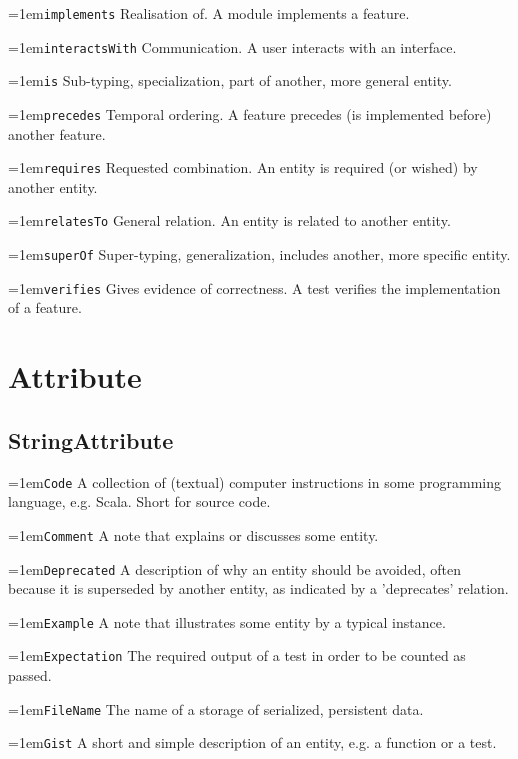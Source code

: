 \documentclass[9pt,a4paper,oneside]{report}
\begin{document}
\begin{multicols*}{4}
\hangindent=1em\lstinline+implements+ Realisation of. A module implements a feature.

\hangindent=1em\lstinline+interactsWith+ Communication. A user interacts with an interface.

\hangindent=1em\lstinline+is+ Sub-typing, specialization, part of another, more general entity.

\hangindent=1em\lstinline+precedes+ Temporal ordering. A feature precedes (is implemented before) another feature.

\hangindent=1em\lstinline+requires+ Requested combination. An entity is required (or wished) by another entity.

\hangindent=1em\lstinline+relatesTo+ General relation. An entity is related to another entity.

\hangindent=1em\lstinline+superOf+ Super-typing, generalization, includes another, more specific entity.

\hangindent=1em\lstinline+verifies+ Gives evidence of correctness. A test verifies the implementation of a feature.

\section*{Attribute}

\subsection*{StringAttribute}

\hangindent=1em\lstinline+Code+ A collection of (textual) computer instructions in some programming language, e.g. Scala. Short for source code.

\hangindent=1em\lstinline+Comment+ A note that explains or discusses some entity.

\hangindent=1em\lstinline+Deprecated+ A description of why an entity should be avoided, often because it is superseded by another entity, as indicated by a 'deprecates' relation.

\hangindent=1em\lstinline+Example+ A note that illustrates some entity by a  typical instance.

\hangindent=1em\lstinline+Expectation+ The required output of a test in order to be counted as passed.

\hangindent=1em\lstinline+FileName+ The name of a storage of serialized, persistent data.

\hangindent=1em\lstinline+Gist+ A short and simple description of an entity, e.g. a function or a test.


\end{multicols*}
\end{document}
